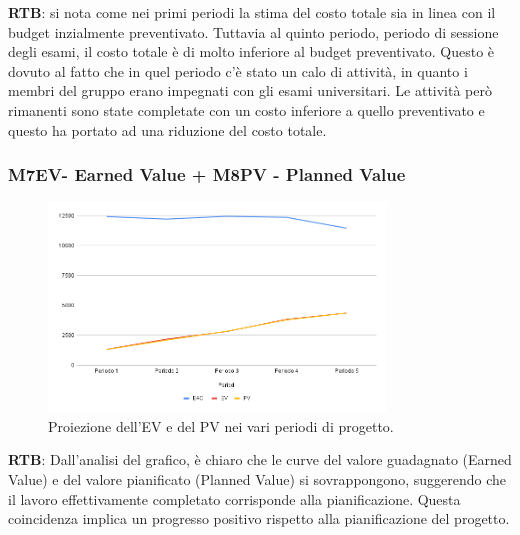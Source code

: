 \textbf{RTB}: si nota come nei primi periodi la stima del costo totale sia in linea con il budget inzialmente preventivato. Tuttavia al quinto periodo, periodo di sessione degli esami, il costo totale è di molto inferiore al budget preventivato. Questo è dovuto al fatto che in quel periodo c'è stato un calo di attività, in quanto i membri del gruppo erano impegnati con gli esami universitari. Le attività però rimanenti sono state completate con un costo inferiore a quello preventivato e questo ha portato ad una riduzione del costo totale.\\

\subsubsection{M7EV- Earned Value + M8PV - Planned Value} 
\begin{figure}[H]
    \centering
    \includegraphics[width=0.8\textwidth]{../Images/PianoDiQualifica/EV_PV.png}
    \caption{Proiezione dell’EV e del PV nei vari periodi di progetto.}
    \label{fig:3}
\end{figure}

\textbf{RTB}: Dall'analisi del grafico, è chiaro che le curve del valore guadagnato (Earned Value) e del valore pianificato (Planned Value) si sovrappongono, suggerendo che il lavoro effettivamente completato corrisponde alla pianificazione. Questa coincidenza implica un progresso positivo rispetto alla pianificazione del progetto.

